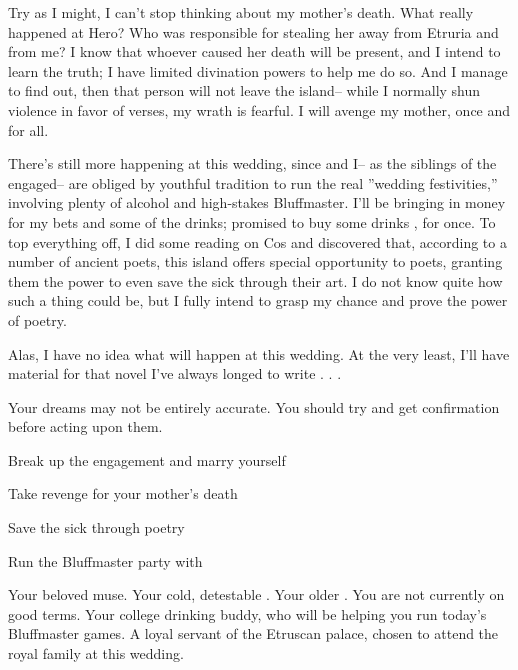 \documentclass[char]{Kos}
\begin{document}
Try as I might, I can't stop thinking about my mother's death. What really happened at Hero? Who was responsible for stealing her away from Etruria and from me? I know that whoever caused her death will be present, and I intend to learn the truth; I have limited divination powers to help me do so. And I manage to find out, then that person will not leave the island-- while I normally shun violence in favor of verses, my wrath is fearful. I will avenge my mother, once and for all.

There's still more happening at this wedding, since \cWard{} and I-- as the siblings of the engaged-- are obliged by youthful tradition to run the real ''wedding festivities,'' involving plenty of alcohol and high-stakes Bluffmaster. I'll be bringing in money for my bets and some of the drinks; \cWard{} promised to buy some drinks \cWard{\themself}, for once. To top everything off, I did some reading on Cos and discovered that, according to a number of ancient poets, this island offers special opportunity to poets, granting them the power to even save the sick through their art. I do not know quite how such a thing could be, but I fully intend to grasp my chance and prove the power of poetry.

Alas, I have no idea what will happen at this wedding. At the very least, I'll have material for that novel I've always longed to write . . . 

\begin{itemz}[Notes]
  \item Your dreams may not be entirely accurate. You should try and get confirmation before acting upon them.
\end{itemz}

\begin{itemz}[Goals]
\item Break up the engagement and marry \cBride{} yourself
\item Take revenge for your mother's death
\item Save the sick through poetry
\item Run the Bluffmaster party with \cWard{}
\end{itemz}


\begin{contacts}
\contact{\cBride{}} Your beloved muse.
\contact{\cEtruriaKing{}} Your cold, detestable \cEtruriaKing{\parent}.
\contact{\cGroom{}} Your older \cGroom{\sibling}. You are not currently on good terms.
\contact{\cWard{}} Your college drinking buddy, who will be helping you run today's Bluffmaster games.
\contact{\cAssassin{}} A loyal servant of the Etruscan palace, chosen to attend the royal family at this wedding.
\end{contacts} 
\end{document}
